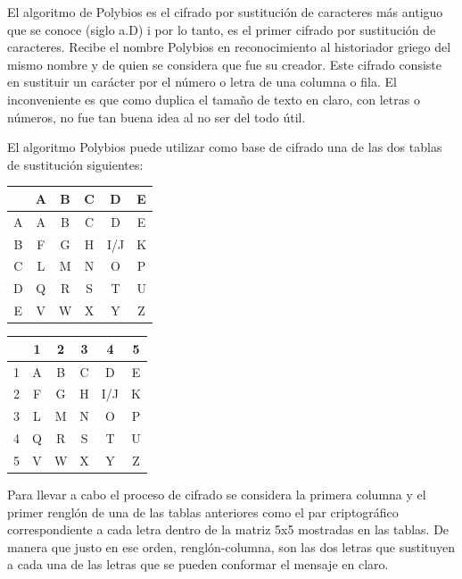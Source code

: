 \documentclass{article}
\newcommand{\RomanNumeralCaps}[1]
    {\MakeUppercase{\romannumeral #1}}
\begin{document}
El algoritmo de Polybios es el cifrado por sustitución de caracteres más antiguo que se conoce (siglo \RomanNumeralCaps{2} a.D) i por lo tanto, es el primer cifrado por sustitución de caracteres. Recibe el nombre Polybios en reconocimiento al historiador griego del mismo nombre y de quien se considera que fue su creador. Este cifrado consiste en sustituir un carácter por el número o letra de una columna o fila. El inconveniente es que como duplica el tamaño de texto en claro, con letras o números, no fue tan buena idea al no ser del todo útil.

El algoritmo Polybios \cite{1} puede utilizar como base de cifrado una de las dos tablas de sustitución siguientes:


 \begin{table}[htbp]
\begin{tabular}{c|ccccc}

 & A & B & C & D & E \\ \hline
A & A & B & C & D & E \\
B & F & G & H & I/J & K \\ 
C & L & M & N & O & P\\
D & Q & R & S & T & U \\ 
E & V & W & X & Y  & Z\\

\end{tabular}
\end{table}


\begin{table}[htbp]
\begin{tabular}{c|ccccc}

 & 1 & 2 & 3 & 4 & 5 \\ \hline
1 & A & B & C & D & E \\
2 & F & G & H & I/J & K \\ 
3 & L & M & N & O & P\\
4 & Q & R & S & T & U \\ 
5 & V & W & X & Y  & Z\\

\end{tabular}
\end{table}


Para llevar a cabo el proceso de cifrado se considera la primera columna y el primer renglón de una de las tablas anteriores como el par criptográfico correspondiente a cada letra dentro de la matriz 5x5 mostradas en las tablas. De manera que justo en ese orden, renglón-columna, son las dos letras que sustituyen a cada una de las letras que se pueden conformar el mensaje en claro. 
\end{document}
